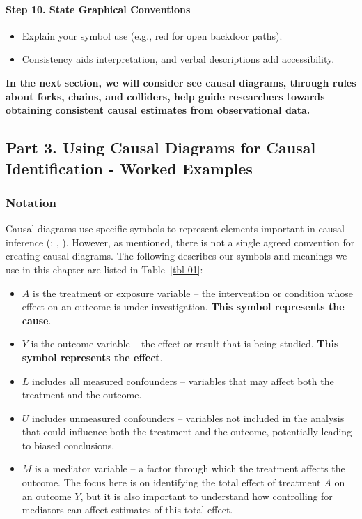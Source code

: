 \documentclass[
  singlecolumn]{article}
\let\oldparagraph\paragraph
\renewcommand{\paragraph}[1]{\oldparagraph{#1}\mbox{}}
\providecommand{\tightlist}{%
  \setlength{\itemsep}{0pt}\setlength{\parskip}{0pt}}\usepackage{longtable,booktabs,array}
\begin{document}
\paragraph{\texorpdfstring{\textbf{Step 10. State Graphical
Conventions}}{Step 10. State Graphical Conventions}}\label{step-10.-state-graphical-conventions}

\begin{itemize}
\tightlist
\item
  Explain your symbol use (e.g., red for open backdoor paths).
\item
  Consistency aids interpretation, and verbal descriptions add
  accessibility.
\end{itemize}

\textbf{In the next section, we will consider see causal diagrams,
through rules about forks, chains, and colliders, help guide researchers
towards obtaining consistent causal estimates from observational data.}

\subsection{Part 3. Using Causal Diagrams for Causal Identification -
Worked Examples}\label{sec-part3}

\subsubsection{Notation}\label{notation}

Causal diagrams use specific symbols to represent elements important in
causal inference (; ,
). However, as mentioned, there is not a
single agreed convention for creating causal diagrams. The following
describes our symbols and meanings we use in this chapter are listed in
Table~\ref{tbl-01}:

\begin{itemize}
\tightlist
\item
  \textbf{\(A\)} is the treatment or exposure variable -- the
  intervention or condition whose effect on an outcome is under
  investigation. \textbf{This symbol represents the cause}.
\item
  \textbf{\(Y\)} is the outcome variable -- the effect or result that is
  being studied. \textbf{This symbol represents the effect}.
\item
  \textbf{\(L\)} includes all measured confounders -- variables that may
  affect both the treatment and the outcome.
\item
  \textbf{\(U\)} includes unmeasured confounders -- variables not
  included in the analysis that could influence both the treatment and
  the outcome, potentially leading to biased conclusions.
\item
  \textbf{\(M\)} is a mediator variable -- a factor through which the
  treatment affects the outcome. The focus here is on identifying the
  total effect of treatment \(A\) on an outcome \(Y\), but it is also
  important to understand how controlling for mediators can affect
  estimates of this total effect.
\end{itemize}
\end{document}
